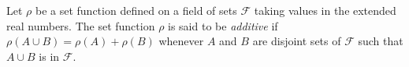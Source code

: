 Let $\rho$ be a set function defined on a field of sets $\mathcal{F}$ taking values in the extended real numbers. The set function $\rho$ is said to be \textit{additive} if $\rho(A \cup B) = \rho(A) + \rho(B)$ whenever $A$ and $B$ are disjoint sets of $\mathcal{F}$ such that $A \cup B$ is in $\mathcal{F}$.
